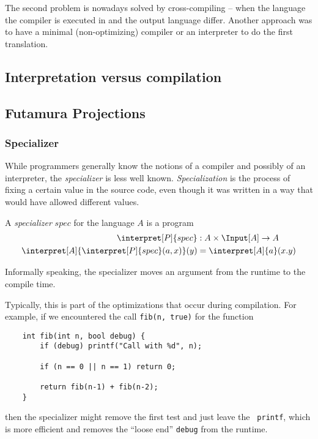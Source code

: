 The second problem is nowadays solved by cross-compiling -- when the language 
the compiler is executed in and the output language differ. Another approach 
was to have a minimal (non-optimizing) compiler or an interpreter to do the 
first translation.

\subsection{Interpretation versus compilation}

\subsection{Futamura Projections} %
\label{sub:Futamura}
\subsubsection{Specializer} %
\label{ssub:Specializer}
While programmers generally know the notions of a compiler and possibly of an 
interpreter, the {\em specializer} is less well known. {\em Specialization} 
is the process of fixing a certain value in the source code, even though it 
was written in a way that would have allowed different values. 

\begin{defn}
	A {\em specializer} $spec$ for the language $A$ is a program 
	\begin{align*}
		\interpret[P]{spec}&:A\times \Input[A]\rightarrow A \\
		\interpret[A]{\interpret[P]{spec}(a, x)}(y) &= \interpret[A]{a}(x.y)
	\end{align*}

	Informally speaking, the specializer moves an argument from the runtime to 
	the compile time.
\end{defn}

Typically, this is part of the optimizations that occur during compilation. For
example, if we encountered the call {\tt fib(n, true)} for the function

\begin{verbatim}
	int fib(int n, bool debug) {
		if (debug) printf("Call with %d", n);

		if (n == 0 || n == 1) return 0;

		return fib(n-1) + fib(n-2);
	}
\end{verbatim}
then the specializer might remove the first test and just leave the {\tt 
printf}, which is more efficient and removes the ``loose end'' {\tt debug}  
from the runtime.


